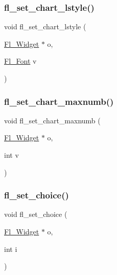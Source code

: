 \mbox{\label{forms_8_h_a7916801334802c0ab2459e8ef73887bf}} 
\subsubsection{\texorpdfstring{fl\+\_\+set\+\_\+chart\+\_\+lstyle()}{fl\_set\_chart\_lstyle()}}
{\footnotesize\ttfamily void fl\+\_\+set\+\_\+chart\+\_\+lstyle (\begin{DoxyParamCaption}\item[{\hyperlink{class_fl___widget}{Fl\+\_\+\+Widget} $\ast$}]{o,  }\item[{\hyperlink{_enumerations_8_h_a2ac46d9f082834b969fffe490a03a709}{Fl\+\_\+\+Font}}]{v }\end{DoxyParamCaption})\hspace{0.3cm}{\ttfamily [inline]}}

\mbox{\label{forms_8_h_a2d417ef268c644805829d45657f09117}} 
\subsubsection{\texorpdfstring{fl\+\_\+set\+\_\+chart\+\_\+maxnumb()}{fl\_set\_chart\_maxnumb()}}
{\footnotesize\ttfamily void fl\+\_\+set\+\_\+chart\+\_\+maxnumb (\begin{DoxyParamCaption}\item[{\hyperlink{class_fl___widget}{Fl\+\_\+\+Widget} $\ast$}]{o,  }\item[{int}]{v }\end{DoxyParamCaption})\hspace{0.3cm}{\ttfamily [inline]}}

\mbox{\label{forms_8_h_a5a48eaa6ea0195643602298c33685b7f}} 
\subsubsection{\texorpdfstring{fl\+\_\+set\+\_\+choice()}{fl\_set\_choice()}}
{\footnotesize\ttfamily void fl\+\_\+set\+\_\+choice (\begin{DoxyParamCaption}\item[{\hyperlink{class_fl___widget}{Fl\+\_\+\+Widget} $\ast$}]{o,  }\item[{int}]{i }\end{DoxyParamCaption})\hspace{0.3cm}{\ttfamily [inline]}}

